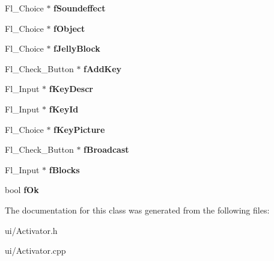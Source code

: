 \begin{DoxyCompactItemize}
\item 
\hypertarget{classActivator_a66270a7cd959310d33af9d8c218fd6c7}{\-Fl\-\_\-\-Choice $\ast$ {\bfseries f\-Soundeffect}}\label{classActivator_a66270a7cd959310d33af9d8c218fd6c7}

\item 
\hypertarget{classActivator_acfdd698c59e7ecf09fe38aa1a5e2a3a3}{\-Fl\-\_\-\-Choice $\ast$ {\bfseries f\-Object}}\label{classActivator_acfdd698c59e7ecf09fe38aa1a5e2a3a3}

\item 
\hypertarget{classActivator_a865e96836a5b2c9f91498b7ffbedaaca}{\-Fl\-\_\-\-Choice $\ast$ {\bfseries f\-Jelly\-Block}}\label{classActivator_a865e96836a5b2c9f91498b7ffbedaaca}

\item 
\hypertarget{classActivator_a80d08d4f0a4f87ef4936ba44b214b845}{\-Fl\-\_\-\-Check\-\_\-\-Button $\ast$ {\bfseries f\-Add\-Key}}\label{classActivator_a80d08d4f0a4f87ef4936ba44b214b845}

\item 
\hypertarget{classActivator_ab9a810c51d6661ca2eb2b95d776216ae}{\-Fl\-\_\-\-Input $\ast$ {\bfseries f\-Key\-Descr}}\label{classActivator_ab9a810c51d6661ca2eb2b95d776216ae}

\item 
\hypertarget{classActivator_ac25b8b03d78e9a8d959e278a3f9c5c68}{\-Fl\-\_\-\-Input $\ast$ {\bfseries f\-Key\-Id}}\label{classActivator_ac25b8b03d78e9a8d959e278a3f9c5c68}

\item 
\hypertarget{classActivator_a384169077ad120602c191c6e877edfc8}{\-Fl\-\_\-\-Choice $\ast$ {\bfseries f\-Key\-Picture}}\label{classActivator_a384169077ad120602c191c6e877edfc8}

\item 
\hypertarget{classActivator_ac91b3eb59fd9816e4100b2e54ab829b4}{\-Fl\-\_\-\-Check\-\_\-\-Button $\ast$ {\bfseries f\-Broadcast}}\label{classActivator_ac91b3eb59fd9816e4100b2e54ab829b4}

\item 
\hypertarget{classActivator_a76003cbb69e22a1bc5a31228e3a00766}{\-Fl\-\_\-\-Input $\ast$ {\bfseries f\-Blocks}}\label{classActivator_a76003cbb69e22a1bc5a31228e3a00766}

\item 
\hypertarget{classActivator_a953e2d10c8c63432247cb222be6078e1}{bool {\bfseries f\-Ok}}\label{classActivator_a953e2d10c8c63432247cb222be6078e1}

\end{DoxyCompactItemize}


\-The documentation for this class was generated from the following files\-:\begin{DoxyCompactItemize}
\item 
ui/\-Activator.\-h\item 
ui/\-Activator.\-cpp\end{DoxyCompactItemize}
